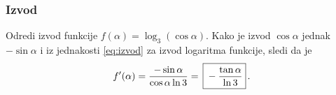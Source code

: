\subsubsection{Izvod}
\zadatak Odredi izvod funkcije $f(\alpha)=\log_3(\cos\alpha)$.
\resenje Kako je izvod $\cos\alpha$ jednak $-\sin\alpha$ i iz jednakosti 
\eqref{eq:izvod} za izvod logaritma funkcije, sledi da je
$$
f'(\alpha)
={-\sin\alpha\over\cos\alpha\ln3}
=\ram{-{\tan\alpha\over\ln3}}.
$$
